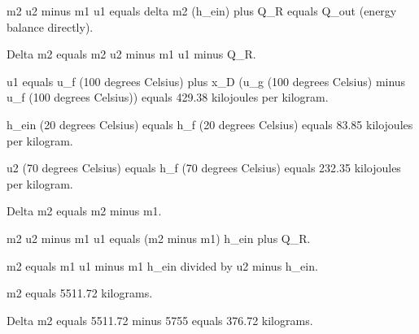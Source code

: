 m2 u2 minus m1 u1 equals delta m2 (h_ein) plus Q_R equals Q_out (energy balance directly).  

Delta m2 equals m2 u2 minus m1 u1 minus Q_R.  

u1 equals u_f (100 degrees Celsius) plus x_D (u_g (100 degrees Celsius) minus u_f (100 degrees Celsius)) equals 429.38 kilojoules per kilogram.  

h_ein (20 degrees Celsius) equals h_f (20 degrees Celsius) equals 83.85 kilojoules per kilogram.  

u2 (70 degrees Celsius) equals h_f (70 degrees Celsius) equals 232.35 kilojoules per kilogram.  

Delta m2 equals m2 minus m1.  

m2 u2 minus m1 u1 equals (m2 minus m1) h_ein plus Q_R.  

m2 equals m1 u1 minus m1 h_ein divided by u2 minus h_ein.  

m2 equals 5511.72 kilograms.  

Delta m2 equals 5511.72 minus 5755 equals 376.72 kilograms.